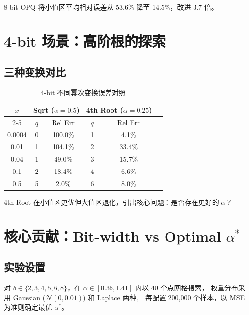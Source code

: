 \documentclass[11pt,a4paper]{article}
\begin{document}
8-bit OPQ 将小值区平均相对误差从 53.6\% 降至 14.5\%，改进 3.7 倍。

\section{4-bit 场景：高阶根的探索}

\subsection{三种变换对比}

\begin{table}[h]
\centering
\caption{4-bit 不同幂次变换误差对照}
\label{tab:4bit_compare}
\begin{tabular}{c|c|c|c|c|c}
\hline
\multirow{2}{*}{$x$} & \multicolumn{2}{c|}{Sqrt ($\alpha{=}0.5$)} & \multicolumn{2}{c}{4th Root ($\alpha{=}0.25$)} \\
\cline{2-5}
 & $q$ & Rel Err & $q$ & Rel Err \\
\hline
0.0004 & 0 & 100.0\% & 1 & 4.1\%  \\
0.01   & 1 & 104.1\% & 2 & 33.4\% \\
0.04   & 1 & 49.0\%  & 3 & 15.7\% \\
0.1    & 2 & 18.4\%  & 4 & 6.6\%  \\
0.5    & 5 & 2.0\%   & 6 & 8.0\%  \\
\hline
\end{tabular}
\end{table}

4th Root 在小值区更优但大值区退化，引出核心问题：是否存在更好的 $\alpha$？

\section{核心贡献：Bit-width vs Optimal $\alpha^*$}

\subsection{实验设置}

对 $b \in \{2, 3, 4, 5, 6, 8\}$，在 $\alpha \in [0.35, 1.41]$ 内以 40 个点网格搜索，
权重分布采用 Gaussian ($\mathcal{N}(0, 0.01)$) 和 Laplace 两种，
每配置 200,000 个样本，以 MSE 为准则确定最优 $\alpha^*$。
\end{document}
